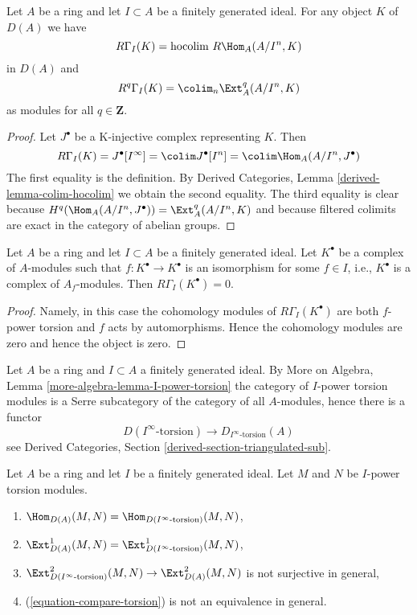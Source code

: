 \begin{lemma}
\label{lemma-local-cohomology-ext}
Let $A$ be a ring and let $I \subset A$ be a finitely generated ideal.
For any object $K$ of $D(A)$ we have
$$
R\Gamma_I(K) = \text{hocolim}\ R\Hom_A(A/I^n, K)
$$
in $D(A)$ and
$$
R^q\Gamma_I(K) = \colim_n \Ext_A^q(A/I^n, K)
$$
as modules for all $q \in \mathbf{Z}$.
\end{lemma}

\begin{proof}
Let $J^\bullet$ be a K-injective complex representing $K$.
Then
$$
R\Gamma_I(K) = J^\bullet[I^\infty] = \colim J^\bullet[I^n] =
\colim \Hom_A(A/I^n, J^\bullet)
$$
The first equality is the definition.
By Derived Categories, Lemma \ref{derived-lemma-colim-hocolim}
we obtain the second equality. The third equality is clear
because $H^q(\Hom_A(A/I^n, J^\bullet)) = \Ext^q_A(A/I^n, K)$
and because filtered colimits are exact in the category of abelian
groups.
\end{proof}

\begin{lemma}
\label{lemma-bad-local-cohomology-vanishes}
Let $A$ be a ring and let $I \subset A$ be a finitely generated ideal.
Let $K^\bullet$ be a complex of $A$-modules such that
$f : K^\bullet \to K^\bullet$ is an isomorphism for some
$f \in I$, i.e., $K^\bullet$ is a complex of $A_f$-modules. Then
$R\Gamma_I(K^\bullet) = 0$.
\end{lemma}

\begin{proof}
Namely, in this case the cohomology modules of $R\Gamma_I(K^\bullet)$
are both $f$-power torsion and $f$ acts by automorphisms. Hence the
cohomology modules are zero and hence the object is zero.
\end{proof}

\noindent
Let $A$ be a ring and $I \subset A$ a finitely generated ideal.
By More on Algebra, Lemma \ref{more-algebra-lemma-I-power-torsion}
the category of $I$-power torsion modules is a Serre subcategory
of the category of all $A$-modules, hence there is a functor
\begin{equation}
\label{equation-compare-torsion}
D(I^\infty\text{-torsion}) \to D_{I^\infty\text{-torsion}}(A)
\end{equation}
see Derived Categories, Section \ref{derived-section-triangulated-sub}.

\begin{lemma}
\label{lemma-not-equal}
Let $A$ be a ring and let $I$ be a finitely generated ideal.
Let $M$ and $N$ be $I$-power torsion modules.
\begin{enumerate}
\item $\Hom_{D(A)}(M, N) = \Hom_{D({I^\infty\text{-torsion}})}(M, N)$,
\item $\Ext^1_{D(A)}(M, N) =
\Ext^1_{D({I^\infty\text{-torsion}})}(M, N)$,
\item $\Ext^2_{D({I^\infty\text{-torsion}})}(M, N) \to
\Ext^2_{D(A)}(M, N)$ is not surjective in general,
\item (\ref{equation-compare-torsion}) is not an equivalence in general.
\end{enumerate}
\end{lemma}

